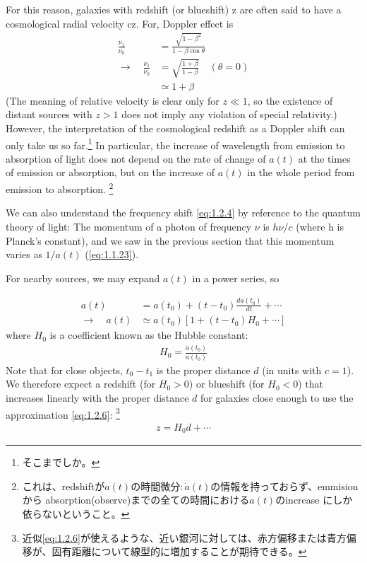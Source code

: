 \documentclass[11pt]{ltjsarticle}
\theoremstyle{plain}
\theoremstyle{break}
\begin{document}
 For this reason, galaxies with redshift (or blueshift) z are often said to have a cosmological radial velocity cz.
 For, Doppler effect is
 \begin{align}
   \frac{\nu_1}{\nu_0}
   &= \frac{\sqrt{1-\beta^2}}{1-\beta \cos\theta}\\
   \rightarrow \quad
   \frac{\nu_1}{\nu_0}& = \sqrt{\frac{1+\beta}{1-\beta}} \quad (\theta = 0) \\
   &\simeq 1+\beta
 \end{align}
(The meaning of relative velocity is clear only for $z \ll 1$, so the existence of distant sources with $z > 1$ does not imply any violation of special relativity.)
However, the interpretation of the cosmological redshift as a Doppler shift can only take us so far.\footnote{そこまでしか。}
In particular, the increase of wavelength from emission to absorption of light does not depend on the rate of change of $a(t)$ at the times of emission or absorption, but on the increase of $a(t)$ in the whole period from emission to absorption.
\footnote{これは、redshiftが$a(t)$の時間微分:\,$\dot{a}(t)$の情報を持っておらず、emmision から absorption(observe)までの全ての時間における$a(t)$のincrease にしか依らないということ。}

We can also understand the frequency shift \eqref{eq:1.2.4} by reference to the quantum theory of light:
The momentum of a photon of frequency $\nu$ is $h\nu/c$ (where h is Planck's constant), and we saw in the previous section that this momentum varies as $1/a(t)$ (\eqref{eq:1.1.23}).

For nearby sources, we may expand $a(t)$ in a power series, so

\begin{align}
  a(t)
  &=  a(t_0)+ (t-t_0)\frac{da(t_0)}{dt} + \cdots \\
     \rightarrow \quad
  a(t)
  &\simeq   a(t_0) [1+ (t - t_0) H_0 + \cdots ] \label{eq:1.2.6}
\end{align}
where $H_0$ is a coefficient known as the Hubble constant:
\begin{align}
  H_0 = \frac{\dot{a}(t_0)}{a(t_0)}
\end{align}
Note that for close objects, $t_0 -t_1$ is the proper distance $d$ (in units with $c=1$). We therefore expect a redshift (for $H_0>0$) or blueshift (for $H_0<0$) that increases linearly with the proper distance $d$ for galaxies close enough to use the approximation \eqref{eq:1.2.6}:
\footnote{近似\eqref{eq:1.2.6}が使えるような、近い銀河に対しては、赤方偏移または青方偏移が、固有距離について線型的に増加することが期待できる。}
\begin{align}
  z = H_0 d + \cdots \label{eq:1.2.9}
\end{align}
\end{document}
